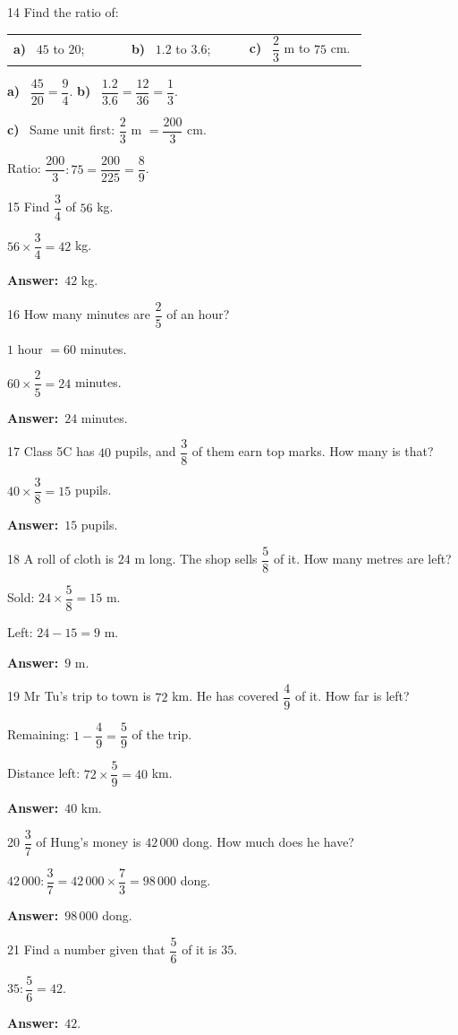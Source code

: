 \documentclass[11pt]{article}
\makeatletter
\newif\ifsol \solfalse
\renewcommand{\arraystretch}{1.35}
\providecommand{\AnsWord}{Đáp số}
\newcommand{\dapso}[1]{\par\textbf{\AnsWord:}\ #1}
\newcommand{\probsol}[1]{%
  \begin{lrbox}{\solmeasure}\begin{minipage}{\dimexpr\linewidth-24pt\relax}#1\end{minipage}\end{lrbox}%
  \ifsol
    \begin{solbox}#1\end{solbox}%
  \else
    \setlength{\solht}{\dimexpr\ht\solmeasure+\dp\solmeasure+0.85cm\relax}%
    \ifdim\solht<1.35cm\setlength{\solht}{1.35cm}\fi
    \begin{tcolorbox}[colback=white,colframe=Line,boxrule=0.8pt,arc=5pt,
      left=8pt,right=8pt,top=4pt,bottom=4pt,height=\solht]{\footnotesize\color{Slate}\itshape\WorkWord}\end{tcolorbox}%
  \fi}
\newcommand{\pa}[1]{\textbf{#1)}\ }
\newenvironment{cols3}{\par\vspace{3pt}\noindent\setlength{\tabcolsep}{0pt}\renewcommand{\arraystretch}{1.3}%
  \begin{tabular}{@{}>{\raggedright\arraybackslash\rule{0pt}{4.4ex}}p{0.32\linewidth}<{\rule[-2.3ex]{0pt}{0pt}}@{\hspace{0.015\linewidth}}>{\raggedright\arraybackslash\rule{0pt}{4.4ex}}p{0.32\linewidth}<{\rule[-2.3ex]{0pt}{0pt}}@{\hspace{0.015\linewidth}}>{\raggedright\arraybackslash\rule{0pt}{4.4ex}}p{0.32\linewidth}<{\rule[-2.3ex]{0pt}{0pt}}@{}}}%
  {\end{tabular}\par}
\newcommand{\gap}{\vspace{0.3cm}}
\def\WorkWord{Your work:}
\def\AnsWord{Answer}
\makeatother
\begin{document}
\gap
\begin{probbox}{14}{\relax}
Find the ratio of:
\begin{cols3}
\pa{a} $45$ to $20$; & \pa{b} $1.2$ to $3.6$; & \pa{c} $\dfrac23$ m to $75$ cm.
\end{cols3}
\end{probbox}
\probsol{
\pa{a} $\dfrac{45}{20}=\dfrac94$. \qquad \pa{b} $\dfrac{1.2}{3.6}=\dfrac{12}{36}=\dfrac13$.\par
\pa{c} Same unit first: $\dfrac23$ m $=\dfrac{200}3$ cm.\par Ratio: $\dfrac{200}3:75=\dfrac{200}{225}=\dfrac89$.
}
\gap
\begin{probbox}{15}{\relax}
Find $\dfrac34$ of $56$ kg.
\end{probbox}
\probsol{
$56\times\dfrac34=42$ kg.
\dapso{$42$ kg.}}
\gap
\begin{probbox}{16}{\relax}
How many minutes are $\dfrac25$ of an hour?
\end{probbox}
\probsol{
$1$ hour $=60$ minutes.\par $60\times\dfrac25=24$ minutes.
\dapso{$24$ minutes.}}
\gap
\begin{probbox}{17}{\relax}
Class 5C has $40$ pupils, and $\dfrac38$ of them earn top marks. How many is that?
\end{probbox}
\probsol{
$40\times\dfrac38=15$ pupils.
\dapso{$15$ pupils.}}
\gap
\begin{probbox}{18}{\relax}
A roll of cloth is $24$ m long. The shop sells $\dfrac58$ of it. How many metres are left?
\end{probbox}
\probsol{
Sold: $24\times\dfrac58=15$ m.\par Left: $24-15=9$ m.
\dapso{$9$ m.}}
\gap
\begin{probbox}{19}{\relax}
Mr Tu's trip to town is $72$ km. He has covered $\dfrac49$ of it. How far is left?
\end{probbox}
\probsol{
Remaining: $1-\dfrac49=\dfrac59$ of the trip.\par Distance left: $72\times\dfrac59=40$ km.
\dapso{$40$ km.}}
\gap
\begin{probbox}{20}{\relax}
$\dfrac37$ of Hung's money is $42\,000$ dong. How much does he have?
\end{probbox}
\probsol{
$42\,000:\dfrac37=42\,000\times\dfrac73=98\,000$ dong.
\dapso{$98\,000$ dong.}}
\gap
\begin{probbox}{21}{\relax}
Find a number given that $\dfrac56$ of it is $35$.
\end{probbox}
\probsol{
$35:\dfrac56=42$.
\dapso{$42$.}}
\end{document}
